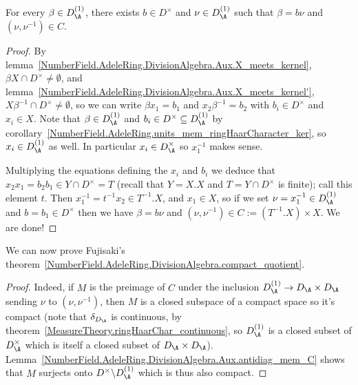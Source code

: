 \begin{lemma}
  \label{NumberField.AdeleRing.DivisionAlgebra.Aux.antidiag_mem_C}
  \leanok
  For every $\beta\in D_{\A}^{(1)}$, there exists $b\in D^\times$
  and $\nu\in D_{\A}^{(1)}$ such that $\beta=b\nu$ and $(\nu,\nu^{-1})\in C.$
\end{lemma}
\begin{proof}
  \leanok
  By lemma~\ref{NumberField.AdeleRing.DivisionAlgebra.Aux.X_meets_kernel},
  $\beta X\cap D^\times\not=\emptyset$,
  and lemma~\ref{NumberField.AdeleRing.DivisionAlgebra.Aux.X_meets_kernel'},
  $X\beta^{-1}\cap D^\times\not=\emptyset$,
  so we can write $\beta x_1=b_1$ and $x_2\beta^{-1}=b_2$ with $b_i\in D^\times$ and $x_i\in X$.
  Note that $\beta\in D_{\A}^{(1)}$ and $b_i\in D^{\times}\subseteq D_{\A}^{(1)}$ by
  corollary~\ref{NumberField.AdeleRing.units_mem_ringHaarCharacter_ker}, so $x_i\in D_{\A}^{(1)}$
  as well. In particular $x_i\in D_{\A}^\times$ so $x_1^{-1}$ makes sense.

  Multiplying the equations defining the $x_i$ and $b_i$ we deduce that
  $x_2x_1=b_2b_1\in Y\cap D^\times=T$ (recall that $Y=X.X$ and $T=Y\cap D^\times$
  is finite); call this element $t$. Then $x_1^{-1}=t^{-1}x_2\in T^{-1}.X$,
  and $x_1\in X$, so if we set $\nu=x_1^{-1}\in D_{\A}^{(1)}$
  and $b=b_1\in D^\times$ then we have $\beta=b\nu$ and $(\nu,\nu^{-1})\in C := (T^{-1}.X)\times X$.
  We are done!
\end{proof}

We can now prove Fujisaki's theorem~\ref{NumberField.AdeleRing.DivisionAlgebra.compact_quotient}.

\begin{proof}
  \leanok
  Indeed, if $M$ is the preimage of $C$ under the inclusion $D_{\A}^{(1)} \to D_{\A}\times D_{\A}$
  sending $\nu$ to $(\nu,\nu^{-1})$, then $M$ is a closed subspace
    of a compact
  space so it's compact (note that $\delta_{D_{\A}}$ is continuous,
  by theorem~\ref{MeasureTheory.ringHaarChar_continuous}, so $D_{\A}^{(1)}$ is a closed subset of
  $D_{\A}^\times$ which is itself a closed subset of $D_{\A}\times D_{\A}$).
  Lemma~\ref{NumberField.AdeleRing.DivisionAlgebra.Aux.antidiag_mem_C} shows that $M$ surjects onto
  $D^\times\backslash D_{\A}^{(1)}$ which is thus also compact.
\end{proof}

